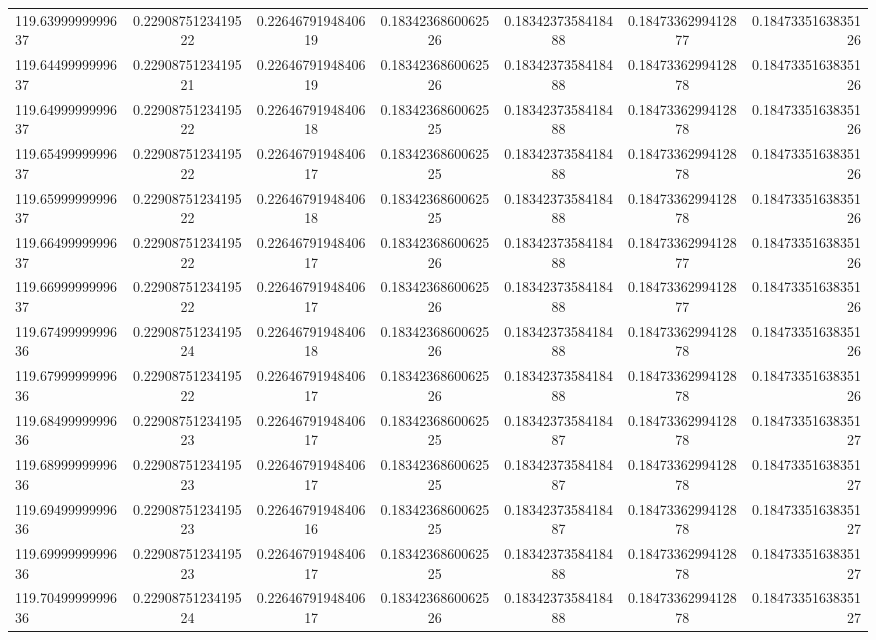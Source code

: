 \begin{tabular}{ l | c | c | c | c | c | r }
119.6399999999637  & 0.2290875123419522  & 0.2264679194840619  & 0.1834236860062526  & 0.1834237358418488  & 0.1847336299412877  & 0.1847335163835126 \\
119.6449999999637  & 0.2290875123419521  & 0.2264679194840619  & 0.1834236860062526  & 0.1834237358418488  & 0.1847336299412878  & 0.1847335163835126 \\
119.6499999999637  & 0.2290875123419522  & 0.2264679194840618  & 0.1834236860062525  & 0.1834237358418488  & 0.1847336299412878  & 0.1847335163835126 \\
119.6549999999637  & 0.2290875123419522  & 0.2264679194840617  & 0.1834236860062525  & 0.1834237358418488  & 0.1847336299412878  & 0.1847335163835126 \\
119.6599999999637  & 0.2290875123419522  & 0.2264679194840618  & 0.1834236860062525  & 0.1834237358418488  & 0.1847336299412878  & 0.1847335163835126 \\
119.6649999999637  & 0.2290875123419522  & 0.2264679194840617  & 0.1834236860062526  & 0.1834237358418488  & 0.1847336299412877  & 0.1847335163835126 \\
119.6699999999637  & 0.2290875123419522  & 0.2264679194840617  & 0.1834236860062526  & 0.1834237358418488  & 0.1847336299412877  & 0.1847335163835126 \\
119.6749999999636  & 0.2290875123419524  & 0.2264679194840618  & 0.1834236860062526  & 0.1834237358418488  & 0.1847336299412878  & 0.1847335163835126 \\
119.6799999999636  & 0.2290875123419522  & 0.2264679194840617  & 0.1834236860062526  & 0.1834237358418488  & 0.1847336299412878  & 0.1847335163835126 \\
119.6849999999636  & 0.2290875123419523  & 0.2264679194840617  & 0.1834236860062525  & 0.1834237358418487  & 0.1847336299412878  & 0.1847335163835127 \\
119.6899999999636  & 0.2290875123419523  & 0.2264679194840617  & 0.1834236860062525  & 0.1834237358418487  & 0.1847336299412878  & 0.1847335163835127 \\
119.6949999999636  & 0.2290875123419523  & 0.2264679194840616  & 0.1834236860062525  & 0.1834237358418487  & 0.1847336299412878  & 0.1847335163835127 \\
119.6999999999636  & 0.2290875123419523  & 0.2264679194840617  & 0.1834236860062525  & 0.1834237358418488  & 0.1847336299412878  & 0.1847335163835127 \\
119.7049999999636  & 0.2290875123419524  & 0.2264679194840617  & 0.1834236860062526  & 0.1834237358418488  & 0.1847336299412878  & 0.1847335163835127 \\

\end{tabular}
